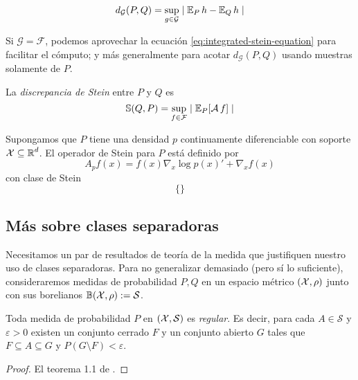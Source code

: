 \documentclass[main.tex]{subfiles}
\begin{document}
\begin{equation*}
    d_\mathcal{G}(P, Q) = \sup_{g\in\mathcal{G}}\mid \operatorname{\mathbb{E}}_Ph - \operatorname{\mathbb{E}}_Qh \mid
\end{equation*}

Si $\mathcal{G}=\mathcal{F}$, podemos aprovechar la ecuación \eqref{eq:integrated-stein-equation} para facilitar el cómputo; y más generalmente para acotar $d_\mathcal{G}(P, Q)$ usando muestras solamente de $P$.

\begin{definition}
    La \textit{discrepancia de Stein} entre $P$ y $Q$ es
    \begin{equation*}
        \mathbb{S} (Q, P) = \sup_{f\in \mathcal{F}}\mid \operatorname{\mathbb{E}}_P[\operatorname{\mathcal{A}} f] \mid
    \end{equation*}
\end{definition}

\begin{theorem}
    Supongamos que $P$ tiene una densidad $p$ continuamente diferenciable con soporte $\operatorname{\mathcal{X}} \subseteq \operatorname{\mathbb{R}}^d$. El operador de Stein para $P$ está definido por
    \begin{equation*}
        A_p f(x) = f(x)\nabla_x\log p(x)' + \nabla_xf(x) 
    \end{equation*}
    con clase de Stein
    \begin{equation*}
        \{\}
    \end{equation*}
\end{theorem}


\subsection{Más sobre clases separadoras}
Necesitamos un par de resultados de teoría de la medida que justifiquen nuestro uso de clases separadoras. Para no generalizar demasiado (pero sí lo suficiente), consideraremos medidas de probabilidad $P, Q$ en un espacio métrico $(\operatorname{\mathcal{X}}, \rho)$ junto con sus borelianos $\mathbb{B}(\operatorname{\mathcal{X}}, \rho) := \mathcal{S}$. 

\begin{lemma}
    Toda medida de probabilidad $P$ en $(\operatorname{\mathcal{X}}, \mathcal{S})$ es \textit{regular}. Es decir, para cada $A\in \mathcal{S}$ y $\varepsilon > 0$ existen un conjunto cerrado $F$ y un conjunto abierto $G$ tales que $F\subseteq A \subseteq G$ y $P(G\setminus F) < \varepsilon$.
\end{lemma}
\begin{proof}
    El teorema 1.1 de \cite{billingsley-convergence}.
\end{proof}
\end{document}
